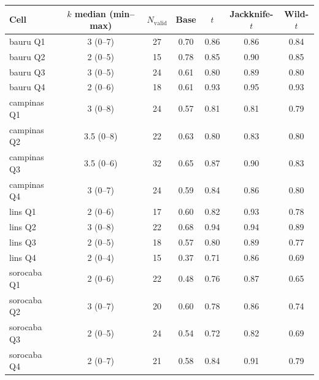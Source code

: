 \begin{tabular}{lcccccc}
\hline
Cell & $k$ median (min--max) & $N_{\mathrm{valid}}$ & Base & $t$ & Jackknife-$t$ & Wild-$t$ \\
\hline
bauru Q1 & 3 (0--7) & 27 & 0.70 & 0.86 & 0.86 & 0.84 \\
bauru Q2 & 2 (0--5) & 15 & 0.78 & 0.85 & 0.90 & 0.85 \\
bauru Q3 & 3 (0--5) & 24 & 0.61 & 0.80 & 0.89 & 0.80 \\
bauru Q4 & 2 (0--6) & 18 & 0.61 & 0.93 & 0.95 & 0.93 \\
campinas Q1 & 3 (0--8) & 24 & 0.57 & 0.81 & 0.81 & 0.79 \\
campinas Q2 & 3.5 (0--8) & 22 & 0.63 & 0.80 & 0.83 & 0.80 \\
campinas Q3 & 3.5 (0--6) & 32 & 0.65 & 0.87 & 0.90 & 0.83 \\
campinas Q4 & 3 (0--7) & 24 & 0.59 & 0.84 & 0.86 & 0.80 \\
lins Q1 & 2 (0--6) & 17 & 0.60 & 0.82 & 0.93 & 0.78 \\
lins Q2 & 3 (0--8) & 22 & 0.68 & 0.94 & 0.94 & 0.89 \\
lins Q3 & 2 (0--5) & 18 & 0.57 & 0.80 & 0.89 & 0.77 \\
lins Q4 & 2 (0--4) & 15 & 0.37 & 0.71 & 0.86 & 0.69 \\
sorocaba Q1 & 2 (0--6) & 22 & 0.48 & 0.76 & 0.87 & 0.65 \\
sorocaba Q2 & 3 (0--7) & 20 & 0.60 & 0.78 & 0.86 & 0.74 \\
sorocaba Q3 & 2 (0--5) & 24 & 0.54 & 0.72 & 0.82 & 0.69 \\
sorocaba Q4 & 2 (0--7) & 21 & 0.58 & 0.84 & 0.91 & 0.79 \\
\hline
\end{tabular}
